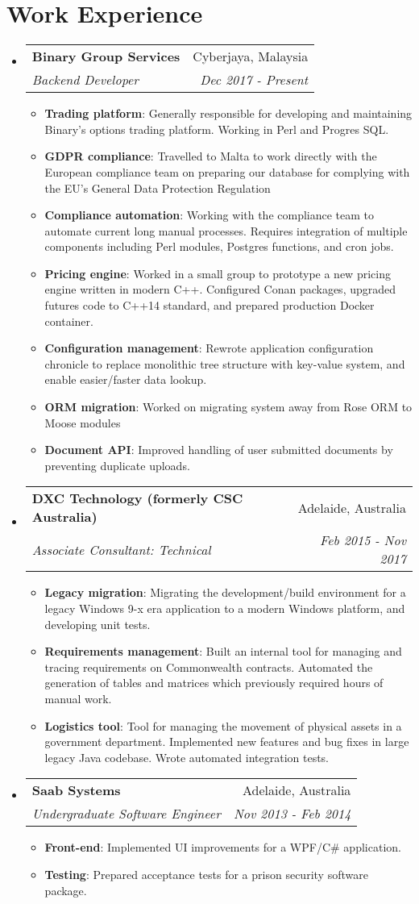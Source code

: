\documentclass[a4paper,11pt]{article}
\makeatletter
\newcommand{\resumeItem}[2]{
  \item\small{
    \textbf{#1}{: #2 \vspace{-2pt}}
  }
}
\newcommand{\resumeSubheading}[4]{
  \vspace{-1pt}\item
    \begin{tabular*}{0.97\textwidth}[t]{l@{\extracolsep{\fill}}r}
      \textbf{#1} & #2 \\
      \textit{\small#3} & \textit{\small #4} \\
    \end{tabular*}\vspace{-5pt}
}
\newcommand{\resumeSubHeadingListStart}{\begin{itemize}[label={}, leftmargin=*]}
\newcommand{\resumeSubHeadingListEnd}{\end{itemize}}
\newcommand{\resumeItemListStart}{\begin{itemize}[label={}]}
\newcommand{\resumeItemListEnd}{\end{itemize}\vspace{-5pt}}
\makeatother
\begin{document}
\section{Work Experience}
\resumeSubHeadingListStart
\resumeSubheading
{Binary Group Services}{Cyberjaya, Malaysia}
{Backend Developer}{Dec 2017 - Present}
\resumeItemListStart
\resumeItem{Trading platform}
    {Generally responsible for developing and maintaining Binary's options trading platform. Working in Perl and Progres SQL.}
\resumeItem{GDPR compliance}
    {Travelled to Malta to work directly with the European compliance team on preparing our database for complying with the EU's General Data Protection Regulation}
\resumeItem{Compliance automation}
    {Working with the compliance team to automate current long manual processes. Requires integration of multiple components including Perl modules, Postgres functions, and cron jobs.}
\resumeItem{Pricing engine}
    {Worked in a small group to prototype a new pricing engine written in modern C++. Configured Conan packages, upgraded futures code to C++14 standard, and prepared production Docker container.}
\resumeItem{Configuration management}
    {Rewrote application configuration chronicle to replace monolithic tree structure with key-value system, and enable easier/faster data lookup.}
\resumeItem{ORM migration}
    {Worked on migrating system away from Rose ORM to Moose modules}
\resumeItem{Document API}
    {Improved handling of user submitted documents by preventing duplicate uploads.}
\resumeItemListEnd
\resumeSubheading
{DXC Technology (formerly CSC Australia)}{Adelaide, Australia}
{Associate Consultant: Technical}{Feb 2015 - Nov 2017}
\resumeItemListStart
\resumeItem{Legacy migration}
    {Migrating the development/build environment for a legacy Windows 9-x era application to a modern Windows platform, and developing unit tests.}
\resumeItem{Requirements management}
    {Built an internal tool for managing and tracing requirements on Commonwealth contracts. Automated the generation of tables and matrices which previously required hours of manual work.}
\resumeItem{Logistics tool}
    {Tool for managing the movement of physical assets in a government department. Implemented new features and bug fixes in large legacy Java codebase. Wrote automated integration tests.}
\resumeItemListEnd
\resumeSubheading
{Saab Systems}{Adelaide, Australia}
{Undergraduate Software Engineer}{Nov 2013 - Feb 2014}
\resumeItemListStart
\resumeItem{Front-end}
    {Implemented UI improvements for a WPF/C\# application.}
\resumeItem{Testing}
    {Prepared acceptance tests for a prison security software package.}
\resumeItemListEnd
\resumeSubHeadingListEnd
\end{document}
